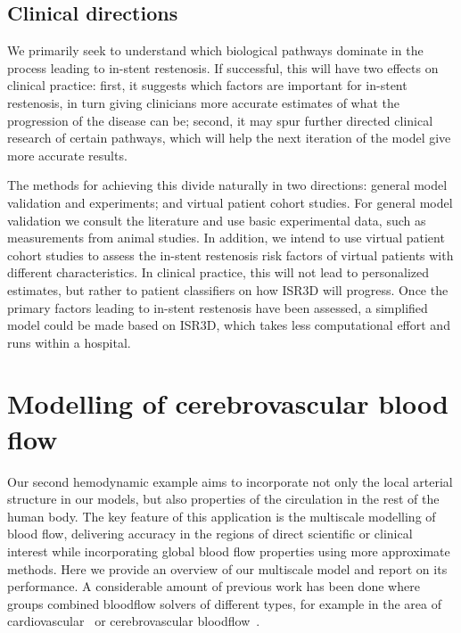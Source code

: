 \documentclass[a4,10pt]{article}
\begin{document}
\subsection{Clinical directions}

We primarily seek to understand which biological pathways dominate in
the process leading to in-stent restenosis. If successful, this will have two
effects on clinical practice: first, it suggests which factors are important for
in-stent restenosis, in turn giving clinicians more accurate estimates of
what the progression of the disease can be; second, it may spur further
directed clinical research of certain pathways, which will help the next
iteration of the model give more accurate results.
 
The methods for achieving this divide naturally in two directions: general
model validation and experiments; and virtual patient cohort studies. For
general model validation we consult the literature and use basic experimental
data, such as measurements from animal studies. In addition, we intend to use
virtual patient cohort studies to assess the in-stent restenosis risk factors
of virtual patients with different characteristics. In clinical practice,
this will not lead to personalized estimates, but rather to patient classifiers
on how ISR3D will progress. Once the primary factors leading to in-stent
restenosis have been assessed, a simplified model could be made based on ISR3D,
which takes less computational effort and runs within a hospital.

\section{Modelling of cerebrovascular blood flow}\label{Sec:HemeLB}

Our second hemodynamic example aims to incorporate not only the local arterial
structure in our models, but also properties of the circulation in the rest of
the human body. The key feature of this application is the multiscale modelling
of blood flow, delivering accuracy in the regions of direct scientific or
clinical interest while incorporating global blood flow properties using
more approximate methods. Here we provide an overview of our multiscale model
and report on its performance.  A considerable amount of previous work has been
done where groups combined bloodflow solvers of different types, for example in
the area of cardiovascular~\cite{Shi:2011,VanDeVosse:2011,Liu:2012} or
cerebrovascular bloodflow~\cite{Alastruey:2008,Grinberg:2011}.
\end{document}
